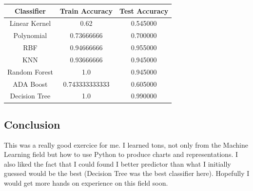 \documentclass{article}
\begin{document}
\begin{table}[htb]
\begin{tabular}{|c|c|c|}
\hline
\textbf{Classifier} & \textbf{Train Accuracy} & \textbf{Test Accuracy} \\ \hline
Linear Kernel       & 0.62                    & 0.545000               \\ \hline
Polynomial          & 0.73666666              & 0.700000               \\ \hline
RBF                 & 0.94666666              & 0.955000               \\ \hline
KNN                 & 0.93666666              & 0.945000               \\ \hline
Random Forest       & 1.0                     & 0.945000               \\ \hline
ADA Boost           & 0.743333333333          & 0.605000               \\ \hline
Decision Tree       & 1.0                     & 0.990000               \\ \hline
\end{tabular}
\end{table}

\subsection{Conclusion}

This was a really good exercice for me. I learned tons, not only from the Machine Learning field but how to use Python to produce charts and representations. I also liked the fact that I could found I better predictor than what I initially guessed would be the best (Decision Tree was the best classifier here). Hopefully I would get more hands on experience on this field soon.
\end{document}
